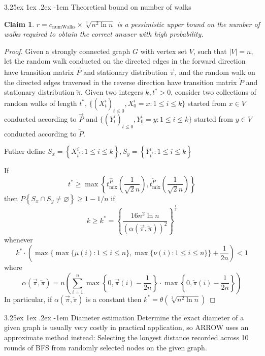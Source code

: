 \documentclass[11pt]{article}
\makeatletter
\renewcommand\paragraph{\@startsection{paragraph}{5}{\z@}%
	{3.25ex \@plus1ex \@minus.2ex}%
	{-1em}%
	{\normalfont\normalsize\bfseries}}
\newtheorem{claim}[theorem]{Claim}
\makeatother
\begin{document}
\paragraph{Theoretical bound on number of walks} {
	\begin{claim}
		$r=c_{\text{numWalks}} \times \sqrt[3]{n^{2} \ln n}$ is a pessimistic upper bound on the number of walks required to obtain the correct anwser with high probability.
	\end{claim}
	\begin{proof}
		Given a strongly connected graph $G$ with vertex set $V$, such that $|V| = n$, let the random walk conducted on the directed edges in the forward direction have transition matrix $\overrightarrow{P}$ and stationary distribution $\overrightarrow{\pi}$, and the random walk on the directed edges traversed in the reverse direction have transition matrix $\overleftarrow{P}$ and stationary distribution $\overleftarrow{\pi}$. Given two integers $k,t^*>0$, consider two collections of random walks of length $t^*$, $\{(X^i_t)_{t\leq0},X_0^i=x:1\leq i\leq k\}$ started from $x\in V$ conducted according to $\overrightarrow{P}$ and $\{(Y^i_t)_{t\leq0},Y_0^i=y:1\leq i\leq k\}$ started from $y\in V$ conducted according to $\overleftarrow{P}$.
		
		Futher define $S_{x}=\left\{X_{t^{*}}^{i}: 1 \leq i \leq k\right\}, S_{y}=\left\{Y_{t^{*}}^{i}: 1 \leq i \leq k\right\}$
		
		If 
		$$t^{*} \geq \max \left\{t_{\operatorname{mix}}^{\overrightarrow{P}}\left(\frac{1}{\sqrt{2} n}\right), t_{\operatorname{mix}}^{\overleftarrow{P}}\left(\frac{1}{\sqrt{2} n}\right)\right\}$$
		then $P\left\{S_{x} \cap S_{y} \neq \varnothing\right\} \geq 1-1 / n$ if
		$$k \geq k^{*}=\left\{\frac{16 n^{2} \ln n}{(\alpha(\overrightarrow{\pi}, \overleftarrow{\pi}))^{2}}\right\}^{\frac{1}{3}}$$ 
		whenever
		$$k^{*} \cdot\left(\max \{\max \{\mu(i): 1 \leq i \leq n\}, \max \{\nu(i): 1 \leq i \leq n\}\}+\frac{1}{2 n}\right)<1$$
		where 
		$$\alpha(\overrightarrow{\pi}, \overleftarrow{\pi})=n\left(\sum_{i=1}^{n} \max \left\{0, \overrightarrow{\pi}(i)-\frac{1}{2 n}\right\} \cdot \max \left\{0, \overleftarrow{\pi}(i)-\frac{1}{2 n}\right\}\right)$$
		In particular, if $\alpha(\overrightarrow{\pi}, \overleftarrow{\pi})$ is a constant then $k^{*}=\theta\left(\sqrt[3]{n^{2} \ln n}\right)$
	\end{proof}
}
\paragraph{Diameter estimation}  {
	Determine the exact diameter of a given graph is usually very costly in practical application, so ARROW uses an approximate method instead: Selecting the longest distance recorded across 10 rounds of BFS from randomly selected nodes on the given graph.
}
\end{document}
